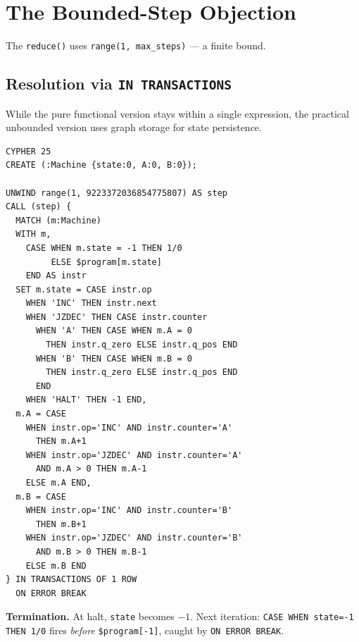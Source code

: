 \documentclass[sigconf, nonacm]{acmart}
\begin{document}
\section{The Bounded-Step Objection}

The \texttt{reduce()} uses \texttt{range(1, max\_steps)} ---
a finite bound.

\subsection{Resolution via \texttt{IN TRANSACTIONS}}

While the pure functional version stays within a single expression,
the practical unbounded version uses graph storage for state persistence.

\begin{codeblock}
\begin{lstlisting}[style=cypher]
CYPHER 25
CREATE (:Machine {state:0, A:0, B:0});

UNWIND range(1, 9223372036854775807) AS step
CALL (step) {
  MATCH (m:Machine)
  WITH m,
    CASE WHEN m.state = -1 THEN 1/0
         ELSE $program[m.state]
    END AS instr
  SET m.state = CASE instr.op
    WHEN 'INC' THEN instr.next
    WHEN 'JZDEC' THEN CASE instr.counter
      WHEN 'A' THEN CASE WHEN m.A = 0
        THEN instr.q_zero ELSE instr.q_pos END
      WHEN 'B' THEN CASE WHEN m.B = 0
        THEN instr.q_zero ELSE instr.q_pos END
      END
    WHEN 'HALT' THEN -1 END,
  m.A = CASE
    WHEN instr.op='INC' AND instr.counter='A'
      THEN m.A+1
    WHEN instr.op='JZDEC' AND instr.counter='A'
      AND m.A > 0 THEN m.A-1
    ELSE m.A END,
  m.B = CASE
    WHEN instr.op='INC' AND instr.counter='B'
      THEN m.B+1
    WHEN instr.op='JZDEC' AND instr.counter='B'
      AND m.B > 0 THEN m.B-1
    ELSE m.B END
} IN TRANSACTIONS OF 1 ROW
  ON ERROR BREAK
\end{lstlisting}
\end{codeblock}

\textbf{Termination.} At halt, \texttt{state} becomes $-1$.
Next iteration: \texttt{CASE WHEN state=-1 THEN 1/0} fires
\emph{before} \texttt{\$program[-1]}, caught by \texttt{ON ERROR BREAK}.
\end{document}

